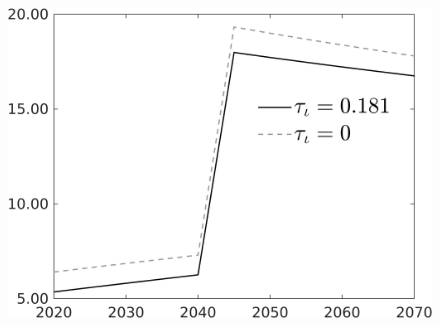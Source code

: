 \documentclass[12pt]{article}
\begin{document}
\begin{figure}[h!!]
\begin{minipage}[]{0.32\textwidth}
	\end{minipage}	
	\begin{minipage}[]{0.32\textwidth}
		\includegraphics[width=1\textwidth]{../../codding_model/own_basedOnFried/optimalPol_010922_revision/figures/all_13Sept22/CompTauf_bytaul_Reg0_gAg_spillover0_nsk0_xgr0_knspil1_sep0_LFlimit1_emsbase0_countec0_GovRev0_etaa0.79_lgd1.png}
	\end{minipage}	
\end{figure}
\end{document}
